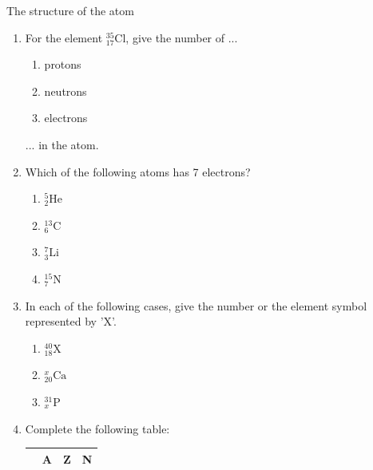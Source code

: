 \begin{exercises}{The structure of the atom}
\begin{enumerate}[noitemsep, label=\textbf{\arabic*}. ]
\begin{enumerate}[noitemsep, label=\textbf{\alph*}. ]
\end{enumerate}
                \label{m38745*uid24}\item 
For the element $_{17}^{35}\text{Cl}$, give the number of ...
\label{m38745*id256843}\begin{enumerate}[noitemsep, label=\textbf{\alph*}. ] 
            \label{m38745*uid25}\item protons
\label{m38745*uid26}\item neutrons
\label{m38745*uid27}\item electrons
\end{enumerate}
... in the atom.\newline
\label{m38745*uid28}\item Which of the following atoms has 7 electrons?
\label{m38745*id256898}\begin{enumerate}[noitemsep, label=\textbf{\alph*}. ] 
            \label{m38745*uid29}\item $_{2}^{5}\text{He}$
\label{m38745*uid30}\item $_{6}^{13}\text{C}$
\label{m38745*uid31}\item $_{3}^{7}\text{Li}$
\label{m38745*uid32}\item $_{7}^{15}\text{N}$
\end{enumerate}
                \label{m38745*uid33}\item 
In each of the following cases, give the number or the element symbol represented by 'X'.
\label{m38745*id257023}\begin{enumerate}[noitemsep, label=\textbf{\alph*}. ] 
            \label{m38745*uid34}\item $_{18}^{40}\text{X}$
\label{m38745*uid35}\item $_{20}^{x}\text{Ca}$
\label{m38745*uid36}\item $_{x}^{31}\text{P}$
\end{enumerate}
                \label{m38745*uid37}\item 
Complete the following table:
          \begin{table}[H]
        \begin{center}
      \label{m38745*id257121}
    \noindent
      \begin{tabular}{|l|l|l|l|}\hline
         &
        \textbf{A} &
        \textbf{Z} &
        \textbf{N} \\ \hline

\end{tabular}
\end{center}
\end{table}
\end{enumerate}
\end{exercises}
